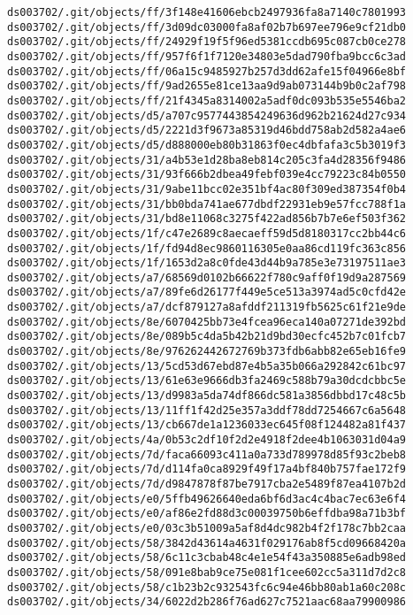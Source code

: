 \documentclass[11pt]{article}
\begin{document}
\begin{Verbatim}[commandchars=\\\{\}]
ds003702/.git/objects/ff/3f148e41606ebcb2497936fa8a7140c7801993
ds003702/.git/objects/ff/3d09dc03000fa8af02b7b697ee796e9cf21db0
ds003702/.git/objects/ff/24929f19f5f96ed5381ccdb695c087cb0ce278
ds003702/.git/objects/ff/957f6f1f7120e34803e5dad790fba9bcc6c3ad
ds003702/.git/objects/ff/06a15c9485927b257d3dd62afe15f04966e8bf
ds003702/.git/objects/ff/9ad2655e81ce13aa9d9ab073144b9b0c2af798
ds003702/.git/objects/ff/21f4345a8314002a5adf0dc093b535e5546ba2
ds003702/.git/objects/d5/a707c9577443854249636d962b21624d27c934
ds003702/.git/objects/d5/2221d3f9673a85319d46bdd758ab2d582a4ae6
ds003702/.git/objects/d5/d888000eb80b31863f0ec4dbfafa3c5b3019f3
ds003702/.git/objects/31/a4b53e1d28ba8eb814c205c3fa4d28356f9486
ds003702/.git/objects/31/93f666b2dbea49febf039e4cc79223c84b0550
ds003702/.git/objects/31/9abe11bcc02e351bf4ac80f309ed387354f0b4
ds003702/.git/objects/31/bb0bda741ae677dbdf22931eb9e57fcc788f1a
ds003702/.git/objects/31/bd8e11068c3275f422ad856b7b7e6ef503f362
ds003702/.git/objects/1f/c47e2689c8aecaeff59d5d8180317cc2bb44c6
ds003702/.git/objects/1f/fd94d8ec9860116305e0aa86cd119fc363c856
ds003702/.git/objects/1f/1653d2a8c0fde43d44b9a785e3e73197511ae3
ds003702/.git/objects/a7/68569d0102b66622f780c9aff0f19d9a287569
ds003702/.git/objects/a7/89fe6d26177f449e5ce513a3974ad5c0cfd42e
ds003702/.git/objects/a7/dcf879127a8afddf211319fb5625c61f21e9de
ds003702/.git/objects/8e/6070425bb73e4fcea96eca140a07271de392bd
ds003702/.git/objects/8e/089b5c4da5b42b21d9bd30ecfc452b7c01fcb7
ds003702/.git/objects/8e/976262442672769b373fdb6abb82e65eb16fe9
ds003702/.git/objects/13/5cd53d67ebd87e4b5a35b066a292842c61bc97
ds003702/.git/objects/13/61e63e9666db3fa2469c588b79a30dcdcbbc5e
ds003702/.git/objects/13/d9983a5da74df866dc581a3856dbbd17c48c5b
ds003702/.git/objects/13/11ff1f42d25e357a3ddf78dd7254667c6a5648
ds003702/.git/objects/13/cb667de1a1236033ec645f08f124482a81f437
ds003702/.git/objects/4a/0b53c2df10f2d2e4918f2dee4b1063031d04a9
ds003702/.git/objects/7d/faca66093c411a0a733d789978d85f93c2beb8
ds003702/.git/objects/7d/d114fa0ca8929f49f17a4bf840b757fae172f9
ds003702/.git/objects/7d/d9847878f87be7917cba2e5489f87ea4107b2d
ds003702/.git/objects/e0/5ffb49626640eda6bf6d3ac4c4bac7ec63e6f4
ds003702/.git/objects/e0/af86e2fd88d3c00039750b6effdba98a71b3bf
ds003702/.git/objects/e0/03c3b51009a5af8d4dc982b4f2f178c7bb2caa
ds003702/.git/objects/58/3842d43614a4631f029176ab8f5cd09668420a
ds003702/.git/objects/58/6c11c3cbab48c4e1e54f43a350885e6adb98ed
ds003702/.git/objects/58/091e8bab9ce75e081f1cee602cc5a311d7d2c8
ds003702/.git/objects/58/c1b23b2c932543fc6c94e46bb80ab1a60c208c
ds003702/.git/objects/34/6022d2b286f76ad627c7521aac68aa79900986

\end{Verbatim}
\end{document}
